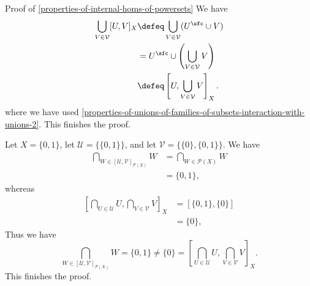 \begin{Proof}{Proof of \cref{properties-of-internal-homs-of-powersets}}
    We have
    \begin{align*}
        \bigcup_{V\in\mathcal{V}}[U,V]_{X} &\defeq \bigcup_{V\in\mathcal{V}}(U^{\sfc}\cup V)\\
                                           &=      U^{\sfc}\cup\left(\bigcup_{V\in\mathcal{V}}V\right)\\
                                           &\defeq \left[U,\bigcup_{V\in\mathcal{V}}V\right]_{X}.
    \end{align*}
    where we have used \cref{properties-of-unions-of-families-of-subsets-interaction-with-unions-2}. This finishes the proof.

    Let $X=\{0,1\}$, let $\mathcal{U}=\{\{0,1\}\}$, and let $\mathcal{V}=\{\{0\},\{0,1\}\}$. We have
    \begin{align*}
        \bigcap_{W\in[\mathcal{U},\mathcal{V}]_{\mathcal{P}(X)}}W &= \bigcap_{W\in\mathcal{P}(X)}W\\
                                                                  &= \{0,1\},
    \end{align*}
    whereas
    \begin{align*}
        \left[\bigcap_{U\in\mathcal{U}}U,\bigcap_{V\in\mathcal{V}}V\right]_{X} &= [\{0,1\},\{0\}]\\
                                                                               &= \{0\},
    \end{align*}
    Thus we have
    \[
        \bigcap_{W\in[\mathcal{U},\mathcal{V}]_{\mathcal{P}(X)}}W%
        =%
        \{0,1\}
        \neq%
        \{0\}
        =%
        \left[\bigcap_{U\in\mathcal{U}}U,\bigcap_{V\in\mathcal{V}}V\right]_{X}.%
    \]%
    This finishes the proof.


\end{Proof}

